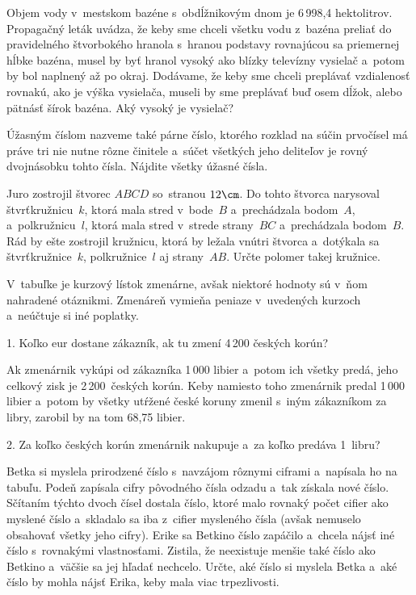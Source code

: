 {%
Objem vody v~mestskom bazéne s~obdĺžnikovým dnom je 6\,998{,}4 hektolitrov.
Propagačný leták uvádza, že keby sme chceli všetku vodu z~bazéna preliať do pravidelného štvorbokého hranola s~hranou podstavy rovnajúcou sa priemernej hĺbke bazéna, musel by byť hranol vysoký ako blízky televízny vysielač a~potom by bol naplnený až po okraj.
Dodávame, že keby sme chceli preplávať vzdialenosť rovnakú, ako je výška
vysielača, museli by sme preplávať buď osem dĺžok, alebo pätnásť šírok bazéna.
Aký vysoký je vysielač?
}

{%
Úžasným číslom nazveme také párne číslo, ktorého rozklad na súčin prvočísel má práve tri nie nutne rôzne činitele a~súčet všetkých jeho deliteľov je rovný dvojnásobku tohto čísla.
Nájdite všetky úžasné čísla.
}

{%
Juro zostrojil štvorec $ABCD$ so~stranou $12\cm$.
Do tohto štvorca narysoval štvrťkružnicu~$k$, ktorá mala stred v~bode~$B$ a~prechádzala bodom~$A$,
a~polkružnicu~$l$, ktorá mala stred v~strede strany~$BC$ a~prechádzala bodom~$B$.
Rád by ešte zostrojil kružnicu, ktorá by ležala vnútri štvorca a~dotýkala
sa štvrťkružnice~$k$, polkružnice~$l$ aj strany~$AB$.
Určte polomer takej kružnice.
}

{%
V~tabuľke je kurzový lístok zmenárne, avšak niektoré hodnoty sú v~ňom nahradené otáznikmi.
Zmenáreň vymieňa peniaze v~uvedených kurzoch a~neúčtuje si iné poplatky.

1. Koľko eur dostane zákazník, ak tu zmení 4\,200 českých korún?

Ak zmenárnik vykúpi od zákazníka 1\,000 libier a~potom ich všetky predá,
jeho celkový zisk je 2\,200~českých korún.
Keby namiesto toho zmenárnik predal 1\,000 libier a~potom by všetky utŕžené
české koruny zmenil s~iným zákazníkom za libry, zarobil by na tom 68{,}75 libier.

2. Za koľko českých korún zmenárnik nakupuje a~za koľko predáva 1~libru?
}

{%
Betka si myslela prirodzené číslo s~navzájom rôznymi ciframi a~napísala ho na tabuľu.
Podeň zapísala cifry pôvodného čísla odzadu a~tak získala nové číslo.
Sčítaním týchto dvoch čísel dostala číslo, ktoré malo rovnaký počet cifier
ako myslené číslo a~skladalo sa iba z~cifier mysleného čísla
(avšak nemuselo obsahovať všetky jeho cifry).
Erike sa Betkino číslo zapáčilo a~chcela nájsť iné číslo s~rovnakými vlastnosťami.
Zistila, že neexistuje menšie také číslo ako Betkino a~väčšie sa jej hľadať nechcelo.
Určte, aké číslo si myslela Betka a~aké číslo by mohla nájsť Erika, keby
mala viac trpezlivosti.
}

